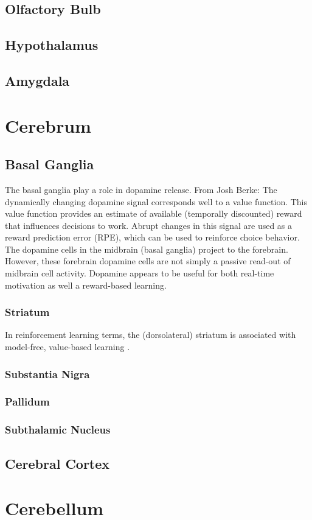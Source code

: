\subsection{Olfactory Bulb}

\subsection{Hypothalamus}

\subsection{Amygdala}



\section{Cerebrum}

\subsection{Basal Ganglia}

The basal ganglia play a role in dopamine release. From Josh Berke: The dynamically changing dopamine signal corresponds well to a value function. This value function provides an estimate of available (temporally discounted) reward that influences decisions to work. Abrupt changes in this signal are used as a reward prediction error (RPE), which can be used to reinforce choice behavior. The dopamine cells in the midbrain (basal ganglia) project to the forebrain. However, these forebrain dopamine cells are not simply a passive read-out of midbrain cell activity. Dopamine appears to be useful for both real-time motivation as well a reward-based learning.

\subsubsection{Striatum}

In reinforcement learning terms, the (dorsolateral) striatum is associated with model-free, value-based learning \cite{daw2005uncertainty}.

\subsubsection{Substantia Nigra}

\subsubsection{Pallidum}

\subsubsection{Subthalamic Nucleus}


\subsection{Cerebral Cortex}





\section{Cerebellum}